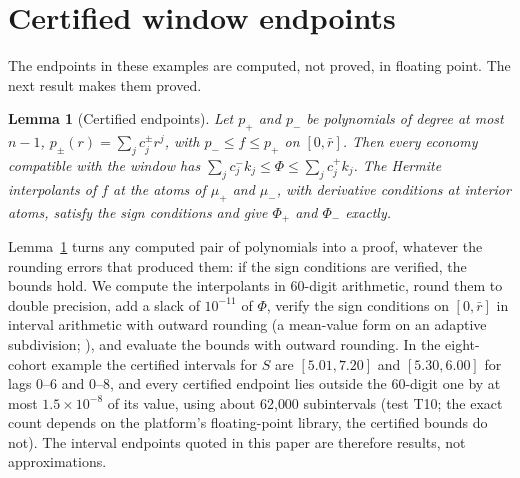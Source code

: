 \documentclass[12pt]{article}
\newtheorem{lemma}[theorem]{Lemma}
\theoremstyle{definition}
\theoremstyle{remark}
\begin{document}
\section{Certified window endpoints}
The endpoints in these examples are computed, not proved, in floating point. The next result makes them proved.

\begin{lemma}[Certified endpoints]\label{lem:certnum}
Let $p_+$ and $p_-$ be polynomials of degree at most $n-1$, $p_\pm(r)=\sum_jc^\pm_jr^j$, with $p_-\le f\le p_+$ on $[0,\bar r]$. Then every economy compatible with the window has $\sum_jc^-_jk_j\le\Phi\le\sum_jc^+_jk_j$. The Hermite interpolants of $f$ at the atoms of $\mu_+$ and $\mu_-$, with derivative conditions at interior atoms, satisfy the sign conditions and give $\Phi_+$ and $\Phi_-$ exactly.
\end{lemma}

Lemma~\ref{lem:certnum} turns any computed pair of polynomials into a proof, whatever the rounding errors that produced them: if the sign conditions are verified, the bounds hold. We compute the interpolants in 60-digit arithmetic, round them to double precision, add a slack of $10^{-11}$ of $\Phi$, verify the sign conditions on $[0,\bar r]$ in interval arithmetic with outward rounding (a mean-value form on an adaptive subdivision; \citealp{rump2010}), and evaluate the bounds with outward rounding. In the eight-cohort example the certified intervals for $S$ are $[5.01,7.20]$ and $[5.30,6.00]$ for lags $0$--$6$ and $0$--$8$, and every certified endpoint lies outside the 60-digit one by at most $1.5\times10^{-8}$ of its value, using about 62{,}000 subintervals (test T10; the exact count depends on the platform's floating-point library, the certified bounds do not). The interval endpoints quoted in this paper are therefore results, not approximations.
\end{document}
